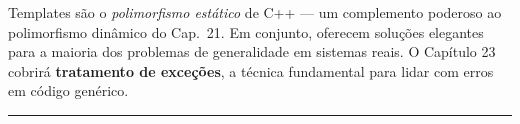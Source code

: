 \documentclass[11pt,a4paper]{article}
\begin{document}
Templates s\~ao o \emph{polimorfismo est\'atico} de C++ --- um complemento poderoso ao polimorfismo din\^amico do Cap.~21. Em conjunto, oferecem solu\c{c}\~oes elegantes para a maioria dos problemas de generalidade em sistemas reais. O Cap\'itulo 23 cobrir\'a \textbf{tratamento de exce\c{c}\~oes}, a t\'ecnica fundamental para lidar com erros em c\'odigo gen\'erico.

\vspace{1em}
\begin{center}\rule{0.5\textwidth}{0.4pt}\end{center}
\end{document}
